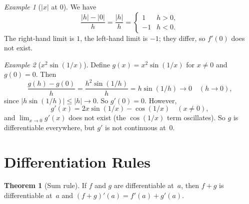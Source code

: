 \documentclass[12pt,a4paper,openany]{book}
\theoremstyle{definition}
\newtheorem{theorem}{Theorem}[chapter]
\theoremstyle{remark}
\newtheorem{example}{Example}[chapter]
\begin{document}
\begin{example}[$|x|$ at $0$]\label{ex:abs-not-diff}
We have
\[
  \frac{|h|-|0|}{h} = \frac{|h|}{h} =
  \begin{cases} 1 & h>0,\\ -1 & h<0.\end{cases}
\]
The right-hand limit is $1$, the left-hand limit is $-1$; they differ,
so $f'(0)$ does not exist.
\end{example}

\begin{center}
\label{fig:abs-corner}
\end{center}

\begin{example}[$x^2\sin(1/x)$]\label{ex:x2sin1x}
Define $g(x)=x^2\sin(1/x)$ for $x\neq 0$ and $g(0)=0$.  Then
\[
  \frac{g(h)-g(0)}{h} = \frac{h^2\sin(1/h)}{h} = h\sin(1/h) \to 0
  \quad(h\to 0),
\]
since $|h\sin(1/h)|\le|h|\to 0$.  So $g'(0)=0$.  However,
\[
  g'(x) = 2x\sin(1/x)-\cos(1/x) \quad(x\neq 0),
\]
and $\lim_{x\to 0}g'(x)$ does not exist (the $\cos(1/x)$ term
oscillates).  So $g$ is differentiable everywhere, but $g'$ is not
continuous at~$0$.
\end{example}

\section{Differentiation Rules}

\begin{theorem}[Sum rule]\label{thm:sum-rule}
If $f$ and $g$ are differentiable at~$a$, then $f+g$ is
differentiable at~$a$ and $(f+g)'(a)=f'(a)+g'(a)$.
\end{theorem}
\end{document}
